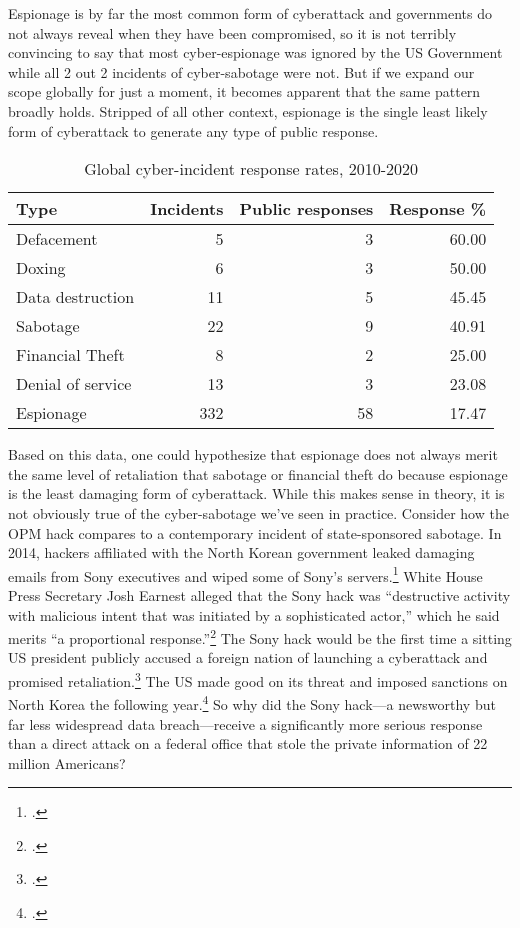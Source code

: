 \documentclass[12pt]{extarticle}
\begin{document}
Espionage is by far the most common form of cyberattack and governments do not always reveal when they have been compromised, so it is not terribly convincing to say that most cyber-espionage was ignored by the US Government while all 2 out 2 incidents of cyber-sabotage were not. But if we expand our scope globally for just a moment, it becomes apparent that the same pattern broadly holds. Stripped of all other context, espionage is the single least likely form of cyberattack to generate any type of public response.

\begin{table}[ht]
\centering
\setlength{\extrarowheight}{2pt}
\small
\begin{tabular}{lrrr}
  \hline
Type & Incidents & Public responses & Response \% \\
  \hline
Defacement &   5 &   3 & 60.00 \\
  Doxing &   6 &   3 & 50.00 \\
  Data destruction &  11 &   5 & 45.45 \\
  Sabotage &  22 &   9 & 40.91 \\
  Financial Theft &   8 &   2 & 25.00 \\
  Denial of service &  13 &   3 & 23.08 \\
  Espionage & 332 &  58 & 17.47 \\
   \hline
\end{tabular}
\caption{Global cyber-incident response rates, 2010-2020}
\label{response-pct}
\end{table}

Based on this data, one could hypothesize that espionage does not always merit the same level of retaliation that sabotage or financial theft do because espionage is the least damaging form of cyberattack. While this makes sense in theory, it is not obviously true of the cyber-sabotage we've seen in practice. Consider how the OPM hack compares to a contemporary incident of state-sponsored sabotage. In 2014, hackers affiliated with the North Korean government leaked damaging emails from Sony executives and wiped some of Sony's servers.\footcite[This hack was allegedly in retaliation for the upcoming James Franco/Seth Rogen comedy about assassinating North Korean leader Kim Jong-Un.]{barnes_sony_2014} White House Press Secretary Josh Earnest alleged that the Sony hack was \enquote{destructive activity with malicious intent that was initiated by a sophisticated actor,} which he said merits \enquote{a proportional response.}\footcite{nakashima_white_2014} The Sony hack would be the first time a sitting US president publicly accused a foreign nation of launching a cyberattack and promised retaliation.\footcite{sanger_u.s._2016} The US made good on its threat and imposed sanctions on North Korea the following year.\footcite{lederman_us_2015} So why did the Sony hack---a newsworthy but far less widespread data breach---receive a significantly more serious response than a direct attack on a federal office that stole the private information of 22 million Americans?
\end{document}
